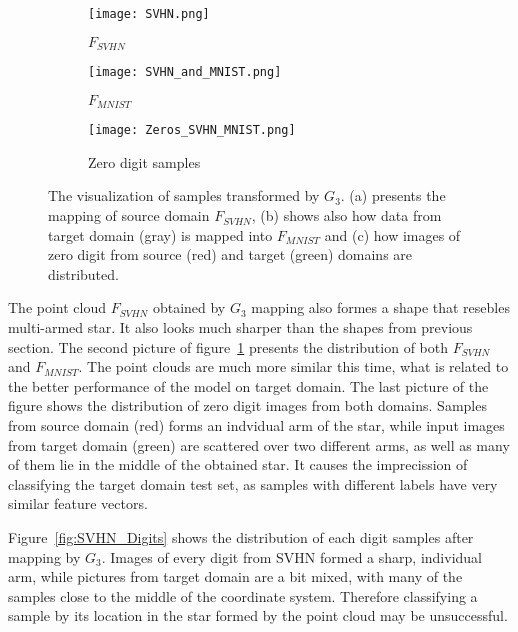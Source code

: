 \documentclass{article}
\begin{document}
\begin{figure}[htb]%
    \centering
    
    \begin{subfigure}[b]{0.33\textwidth}
        \texttt{[image: SVHN.png]}
        \caption{$F_{SVHN}$}
    \end{subfigure}%
    \begin{subfigure}[b]{0.33\textwidth}
        \texttt{[image: SVHN\_and\_MNIST.png]}
        \caption{$F_{MNIST}$}
    \end{subfigure}%
    \begin{subfigure}[b]{0.33\textwidth}
        \texttt{[image: Zeros\_SVHN\_MNIST.png]}
        \caption{Zero digit samples}
    \end{subfigure}%

    \caption{The visualization of samples transformed by $G_{3}$. (a) presents the mapping of source domain $F_{SVHN}$, (b) shows also how data from target domain (gray) is mapped into $F_{MNIST}$ and (c) how images of zero digit from source (red) and target (green) domains are distributed.}%
    \label{fig:SVHN_3D}%
\end{figure}
\par
The point cloud $F_{SVHN}$ obtained by $G_{3}$ mapping also formes a shape that resebles multi-armed star. It also looks much sharper than the shapes from previous section. The second picture of figure~\ref{fig:SVHN_3D} presents the distribution of both $F_{SVHN}$ and $F_{MNIST}$. The point clouds are much more similar this time, what is related to the better performance of the model on target domain. The last picture of the figure shows the distribution of zero digit images from both domains. Samples from source domain (red) forms an indvidual arm of the star, while input images from target domain (green) are scattered over two different arms, as well as many of them lie in the middle of the obtained star. It causes the imprecission of classifying the target domain test set, as samples with different labels have very similar feature vectors.
\par
Figure~\ref{fig:SVHN_Digits} shows the distribution of each digit samples after mapping by $G_{3}$. Images of every digit from SVHN formed a sharp, individual arm, while pictures from target domain are a bit mixed, with many of the samples close to the middle of the coordinate system. Therefore classifying a sample by its location in the star formed by the point cloud may be unsuccessful.
\end{document}
